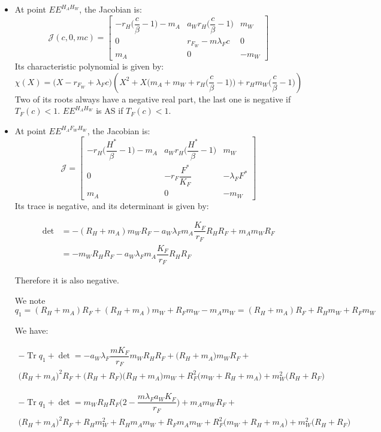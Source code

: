 \documentclass{article}
\newcommand{\lfw}{\lambda_{F}}
\DeclareMathOperator{\Tr}{Tr}
\begin{document}
\begin{itemize}
\item At point $EE^{H_AH_W}$, the Jacobian is:
$$
\mathcal{J}(c, 0, mc) = \begin{bmatrix}
-r_H \Big(\dfrac{c}{\beta}-1\Big) - m_A & a_W r_H \Big(\dfrac{c}{\beta}-1\Big) & m_W \\
0 & r_{F_W}- m \lfw c  & 0 \\
m_A & 0 & -m_W
\end{bmatrix}
$$
Its characteristic polynomial is given by:
$$
\chi(X) = \Big(X -r_{F_W}+ \lfw c\Big) \left(X^2 + X \Big(m_A + m_W + r_H\Big(\dfrac{c}{\beta}-1\Big)\Big) +r_H m_W \Big(\dfrac{c}{\beta}-1\Big) \right)
$$
Two of its roots always have a negative real part, the last one is negative if $T_F(c) < 1$. $EE^{H_AH_W}$ is AS if $T_F(c) < 1$.


\item At point $EE^{H_AF_WH_W}$, the Jacobian is:
$$
\mathcal{J} = \begin{bmatrix}
-r_H \Big(\dfrac{H^*}{\beta}-1\Big) - m_A & a_W r_H \Big(\dfrac{H^*}{\beta}-1\Big) & m_W \\
0 & -r_F \dfrac{F^*}{K_F}  & -\lfw F^* \\
m_A & 0 & -m_W
\end{bmatrix}
$$
Its trace is negative, and its determinant is given by:

\begin{align*}
\det &= -(R_H+m_A)m_WR_F - a_W \lfw m_A \dfrac{K_F}{r_F} R_H R_F + m_A m_W R_F \\
&=-m_WR_HR_F - a_W \lfw m_A \dfrac{K_F}{r_F} R_H R_F
\end{align*}

Therefore it is also negative.


We note $q_1 = (R_H +m_A)R_F + (R_H +m_A)m_W + R_F m_W - m_A m_W = (R_H +m_A)R_F + R_H m_W+ R_F m_W$

We have:

\begin{multline*}
-\Tr q_1 + \det = -a_W \lfw \dfrac{mK_F}{r_F} m_W R_H R_F + \Big(R_H + m_A\Big) m_W R_F + \\ \Big(R_H + m_A\Big)^2 R_F + \Big(R_H + R_F\Big)\Big(R_H + m_A\Big)m_W + R_F^2\Big(m_W + R_H + m_A\Big) + m_W^2 \Big(R_H + R_F\Big)
\end{multline*}

\begin{multline*}
-\Tr q_1 + \det = m_W R_H R_F \Big(2 -  \dfrac{m \lfw a_W K_F}{r_F} \Big) + m_A m_W R_F + \\ \Big(R_H + m_A\Big)^2 R_F + R_Hm_W^2 + R_H m_A m_W + R_Fm_Am_W + R_F^2\Big(m_W + R_H + m_A\Big) + m_W^2 \Big(R_H + R_F\Big)
\end{multline*}


\end{itemize}
\end{document}
